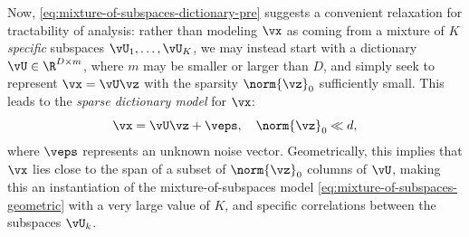 \documentclass[../../book-main.tex]{subfiles}
\begin{document}
Now, \eqref{eq:mixture-of-subspaces-dictionary-pre} suggests a convenient relaxation for tractability of analysis: rather than modeling $\vx$ as coming from a mixture of $K$ \textit{specific} subspaces $\vU_1, \dots, \vU_K$, we may instead start with a dictionary $\vU \in \R^{D \times m}$, where $m$ may be smaller or larger than $D$, and simply seek to represent $\vx = \vU \vz$ with the sparsity $\norm{\vz}_0$ sufficiently small.
This leads to the \textit{sparse dictionary model} for $\vx$:
\begin{equation}\label{eq:mixture-of-subspaces-dictionary}
    \vx =  \vU \vz + \veps,
    \quad
    \norm{\vz}_0 \ll d,
\end{equation}
where $\veps$ represents an unknown noise vector.
Geometrically, this implies that $\vx$ lies close to the span of a subset of $\norm{\vz}_0$ columns of $\vU$,
making this an instantiation of the mixture-of-subspaces model \eqref{eq:mixture-of-subspaces-geometric} with a very large value of $K$, and specific correlations between the subspaces $\vU_k$.
\end{document}
